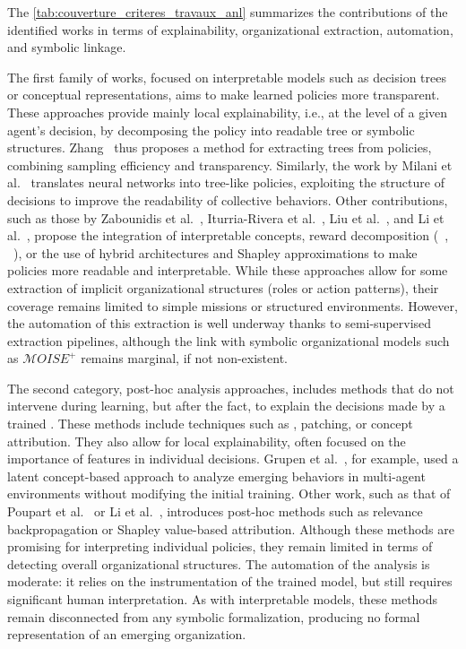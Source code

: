 The \autoref{tab:couverture_criteres_travaux_anl} summarizes the contributions of the identified works in terms of explainability, organizational extraction, automation, and symbolic linkage.

The first family of works, focused on interpretable models such as decision trees or conceptual representations, aims to make learned policies more transparent. These approaches provide mainly local explainability, i.e., at the level of a given agent's decision, by decomposing the policy into readable tree or symbolic structures. Zhang~\cite {zhang2024advancing} thus proposes a method for extracting trees from  policies, combining sampling efficiency and transparency. Similarly, the work  by Milani et al.~\cite{milani2022maviper,milani2024interpretable} translates neural networks into tree-like policies, exploiting the structure of decisions to improve the readability of collective behaviors. Other contributions, such as those by Zabounidis et al.~\cite{zabounidis2023concept}, Iturria-Rivera et al.~\cite{iturria2024explainable}, Liu et al.~\cite{liu2025}, and Li et al.~\cite{li2025from}, propose the integration of interpretable concepts, reward decomposition (~\cite{Sunehag2018}, ~\cite{Tabish2018}), or the use of hybrid architectures and Shapley approximations to make policies more readable and interpretable. While these approaches allow for some extraction of implicit organizational structures (roles or action patterns), their coverage remains limited to simple missions or structured environments. However, the automation of this extraction is well underway thanks to semi-supervised extraction pipelines, although the link with symbolic organizational models such as $\mathcal{M}OISE^+$ remains marginal, if not non-existent.

The second category, post-hoc analysis approaches, includes methods that do not intervene during learning, but after the fact, to explain the decisions made by a trained . These methods include techniques such as , patching, or concept attribution. They also allow for local explainability, often focused on the importance of features in individual decisions. Grupen et al.~\cite{grupen2022concept}, for example, used a latent concept-based approach to analyze emerging behaviors in multi-agent environments without modifying the initial training. Other work, such as that of Poupart et al.~\cite{poupart2025perspectives} or Li et al.~\cite{li2025from}, introduces post-hoc methods such as relevance backpropagation or Shapley value-based attribution. Although these methods are promising for interpreting individual policies, they remain limited in terms of detecting overall organizational structures. The automation of the analysis is moderate: it relies on the instrumentation of the trained model, but still requires significant human interpretation. As with interpretable models, these methods remain disconnected from any symbolic formalization, producing no formal representation of an emerging organization.

